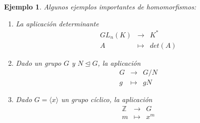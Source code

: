 \documentclass[12pt]{article}
\newtheorem{example}{Ejemplo}[theorem]
\begin{document}
\begin{example}\label{eq:ejsHoms} Algunos ejemplos importantes de homomorfismos:
\begin{enumerate}
\item La aplicación determinante $$\begin{array}{rccl}
&GL_n(K)&\longrightarrow &K^* \\
&A& \longmapsto &det(A)
\end{array}
$$
\item Dado un grupo $G$ y $N \unlhd G$, la aplicación $$\begin{array}{rccl}
&G&\longrightarrow &G/N \\
&g& \longmapsto &gN
\end{array}
$$
\item Dado $G = \langle x \rangle$ un grupo cíclico, la aplicación $$\begin{array}{rccl}
&\mathbb{Z}&\longrightarrow &G \\
&m& \longmapsto &x^m
\end{array}
$$
\end{enumerate}
\end{example}
\end{document}

